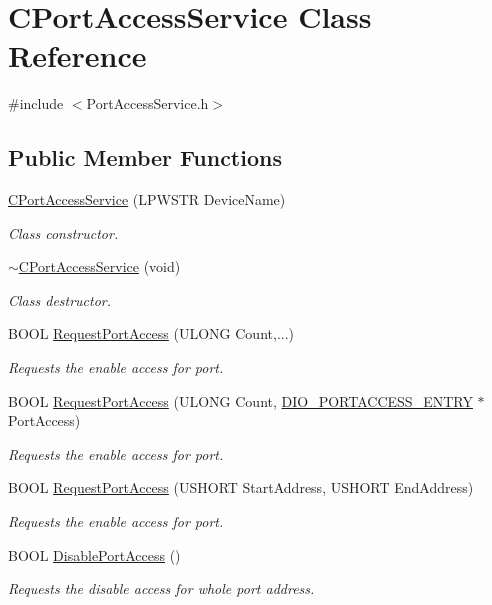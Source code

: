 \hypertarget{class_c_port_access_service}{}\section{C\+Port\+Access\+Service Class Reference}
\label{class_c_port_access_service}


{\ttfamily \#include $<$Port\+Access\+Service.\+h$>$}

\subsection*{Public Member Functions}
\begin{DoxyCompactItemize}
\item 
\mbox{\hyperlink{class_c_port_access_service_a2e1907a99d94146144c8e0a0bba312d5}{C\+Port\+Access\+Service}} (L\+P\+W\+S\+TR Device\+Name)
\begin{DoxyCompactList}\small\item\em Class constructor. \end{DoxyCompactList}\item 
\mbox{\hyperlink{class_c_port_access_service_a237d51c88c217e2e31626d1ab6a610c9}{$\sim$\+C\+Port\+Access\+Service}} (void)
\begin{DoxyCompactList}\small\item\em Class destructor. \end{DoxyCompactList}\item 
B\+O\+OL \mbox{\hyperlink{class_c_port_access_service_aa0b4f72031c3b169bda30fc649c570c2}{Request\+Port\+Access}} (U\+L\+O\+NG Count,...)
\begin{DoxyCompactList}\small\item\em Requests the enable access for port. \end{DoxyCompactList}\item 
B\+O\+OL \mbox{\hyperlink{class_c_port_access_service_acae5a580c350500eb2d3e5308ea1b9f6}{Request\+Port\+Access}} (U\+L\+O\+NG Count, \mbox{\hyperlink{dioctl_8h_a2f0c3270029e69f24ab5023d93a1ab84}{D\+I\+O\+\_\+\+P\+O\+R\+T\+A\+C\+C\+E\+S\+S\+\_\+\+E\+N\+T\+RY}} $\ast$Port\+Access)
\begin{DoxyCompactList}\small\item\em Requests the enable access for port. \end{DoxyCompactList}\item 
B\+O\+OL \mbox{\hyperlink{class_c_port_access_service_a49681d93f8c2d31b98fa0f670b05591d}{Request\+Port\+Access}} (U\+S\+H\+O\+RT Start\+Address, U\+S\+H\+O\+RT End\+Address)
\begin{DoxyCompactList}\small\item\em Requests the enable access for port. \end{DoxyCompactList}\item 
B\+O\+OL \mbox{\hyperlink{class_c_port_access_service_af92909af5b653f777abc4c7d89692f47}{Disable\+Port\+Access}} ()
\begin{DoxyCompactList}\small\item\em Requests the disable access for whole port address. \end{DoxyCompactList}\end{DoxyCompactItemize}



